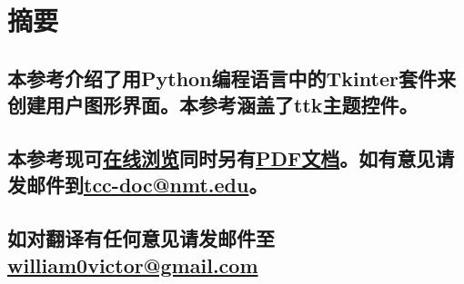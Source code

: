 \section*{摘要}

\subsection*{
本参考介绍了用Python编程语言中的Tkinter套件来创建用户图形界面。本参考涵盖了ttk主题控件。
}
\subsection*{
本参考现可\href{http://www.nmt.edu/tcc/help/pubs/tkinter/}{在线浏览\footnotemark[1]}同时另有\href{http://www.nmt.edu/tcc/help/pubs/tkinter/tkinter.pdf}{PDF文档\footnotemark[2]}。如有意见请发邮件到\href{mailto:tcc-doc@nmt.edu}{\textsf{tcc-doc@nmt.edu}}。
}
\subsection*{
如对翻译有任何意见请发邮件至\href{mailto:william0victor@gmail.com}{\textsf{william0victor@gmail.com}}
}
